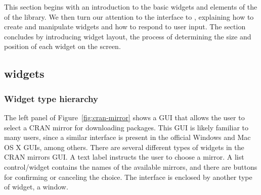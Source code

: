 \documentclass[article,shortnames]{jss}
\begin{document}
This section begins with an introduction to the basic widgets and
elements of the of the  library.  We then turn our attention
to the  interface to , explaining how to
create and manipulate widgets and how to respond to user input. The
section concludes by introducing widget layout, the process of
determining the size and position of each widget on the screen.


\subsection[GTK+ widgets]{ widgets}

\subsubsection{Widget type hierarchy}



The left panel of Figure~\ref{fig:cran-mirror} shows a  GUI
that allows the user to select a CRAN mirror for downloading
 packages.  This GUI is likely familiar to many
 users, since a similar interface is present in the
official Windows and Mac OS X  GUIs, among others.  There
are several different types of widgets in the CRAN mirrors GUI.  A
text label instructs the user to choose a mirror.  A list
control/widget contains the names of the available mirrors, and there
are buttons for confirming or canceling the choice.  The interface is
enclosed by another type of widget, a window.
\end{document}
